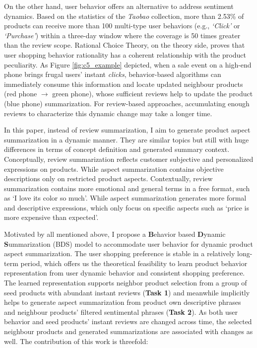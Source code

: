 On the other hand, user behavior offers an alternative to address sentiment dynamics. Based on the statistics of the \textit{Taobao} collection, more than 2.53\% of products can receive more than 100 multi-type user behaviors (e.g., \textit{`Click'} or \textit{`Purchase'}) within a three-day window where the coverage is 50 times greater than the review scope. Rational Choice Theory, on the theory side, proves that user shopping behavior rationality has a coherent relationship with the product peculiarity. As Figure \ref{fig:c5_example} depicted, when a sale event on a high-end phone brings frugal users' instant \textit{clicks}, behavior-based algorithms can immediately consume this information and locate updated neighbour products (red phone $\rightarrow$ green phone), whose sufficient reviews help to update the product (blue phone) summarization. For review-based approaches, accumulating enough reviews to characterize this dynamic change may take a longer time. 

In this paper, instead of review summarization, I aim to generate product aspect summarization in a dynamic manner. They are similar topics but still with huge differences in terms of concept definition and generated summary context. Conceptually, review summarization reflects customer subjective and personalized expressions on products. While aspect summarization contains objective descriptions only on restricted product aspects. Contextually, review summarization contains more emotional and general terms in a free format, such as `I love its color so much'. While aspect summarization generates more formal and descriptive expressions, which only focus on specific aspects such as `price is more expensive than expected'. 

Motivated by all mentioned above, I propose a  \textbf{B}ehavior based \textbf{D}ynamic \textbf{S}ummarization (BDS) model to accommodate user behavior for dynamic product aspect summarization. The user shopping preference is stable in a relatively long-term period, which offers us the theoretical feasibility to learn product behavior representation from user dynamic behavior and consistent shopping preference. The learned representation supports neighbor product selection from a group of seed products with abundant instant reviews (\textbf{Task 1}) and meanwhile implicitly helps to generate aspect summarization from product own descriptive phrases and neighbour products' filtered sentimental phrases (\textbf{Task 2}). As both user behavior and seed products' instant reviews are changed across time, the selected neighbour products and generated summarizations are associated with changes as well. The contribution of this work is threefold: 

